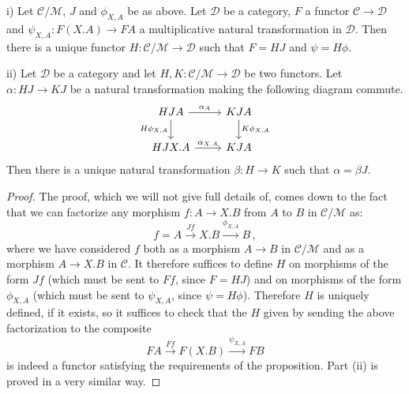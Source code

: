 \documentclass{svproc}
\newcommand\C{\mathcal{C}}
\newcommand\D{\mathcal{D}}
\newcommand\M{\mathcal{M}}
\newcommand*\from{\colon}
\newcommand{\0}{{\mathtt{0}}} \newcommand{\com}{{\mathtt{com}}}
\begin{document}
\begin{proposition}
  i) Let $\C/\M$, $J$ and $\phi_{X,A}$ be as above.  
  Let $\D$ be a category, $F$ a functor $\C\to \D$ and $\psi_{X,A}\from F(X.A) \to FA$ a multiplicative natural transformation in $\D$.  
  Then there is a unique functor $H\from \C/\M\to \D$ such that $F=H J$ and $\psi=H\phi$.

  ii) Let $\D$ be a category and let $H,K\from \C/\M\to \D$ be two functors.  
  Let $\alpha\from HJ \to KJ$ be a natural transformation making the following diagram commute.
  \[
    \begin{tikzcd}
      HJ A \arrow[r, "\alpha_A"] \arrow[d, "H\phi_{X,A}"']
        & KJ A \arrow[d, "K\phi_{X,A}"] \\
      HJ X.A \arrow[r, "\alpha_{X.A}"]
        & KJ A
    \end{tikzcd}
    \]
  Then there is a unique natural transformation $\beta\from H\to K$ such that $\alpha=\beta J$.
  \label{quotient-universal}
\end{proposition}

\begin{proof}
  The proof, which we will not give full details of, comes down to the fact that we can factorize any morphism $f\from A \to X.B$ from $A$ to $B$ in $\C/\M$ as:
  \[
    f = A \xrightarrow{Jf}
    X.B \xrightarrow{\phi_{X,A}}
    B\,,
    \]
  where we have considered $f$ both as a morphism $A\to B$ in $\C/\M$ and as a morphism $A \to X.B$ in $\C$.  
  It therefore suffices to define $H$ on morphisms of the form $Jf$ (which must be sent to $Ff$, since $F=HJ$) and on morphisms of the form $\phi_{X,A}$ (which must be sent to $\psi_{X,A}$, since $\psi=H\phi$).  
  Therefore $H$ is uniquely defined, if it exists, so it suffices to check that the $H$ given by sending the above factorization to the composite
  \[
    FA \xrightarrow{Ff}
    F(X.B) \xrightarrow{\psi_{X,A}}
    FB
    \]
  is indeed a functor satisfying the requirements of the proposition.  
  Part (ii) is proved in a very similar way.
\end{proof}
\end{document}

